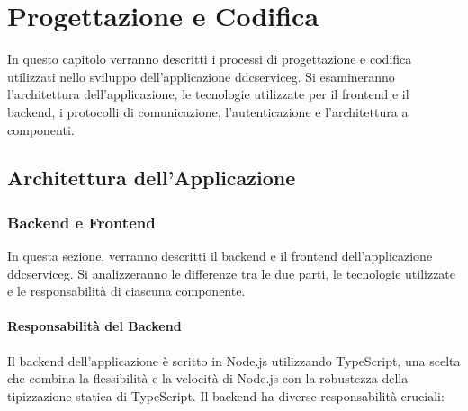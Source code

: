 \chapter{Progettazione e Codifica}
\label{chap:design_coding}

In questo capitolo verranno descritti i processi di progettazione e codifica utilizzati nello sviluppo dell'applicazione \gls{ddcserviceg}\glox. Si esamineranno l'architettura dell'applicazione, le tecnologie utilizzate per il frontend e il backend, i protocolli di comunicazione, l'autenticazione e l'architettura a componenti.

\section{Architettura dell'Applicazione}
\label{sec:architettura_applicazione}

\subsection{Backend e Frontend}
\label{subsec:backend_frontend}

In questa sezione, verranno descritti il backend e il frontend dell'applicazione \gls{ddcserviceg}\glox. Si analizzeranno le differenze tra le due parti, le tecnologie utilizzate e le responsabilità di ciascuna componente.

\subsubsection*{Responsabilità del Backend}
Il backend dell'applicazione è scritto in Node.js utilizzando TypeScript, una scelta che combina la flessibilità e la velocità di Node.js con la robustezza della tipizzazione statica di TypeScript.
Il backend ha diverse responsabilità cruciali:

